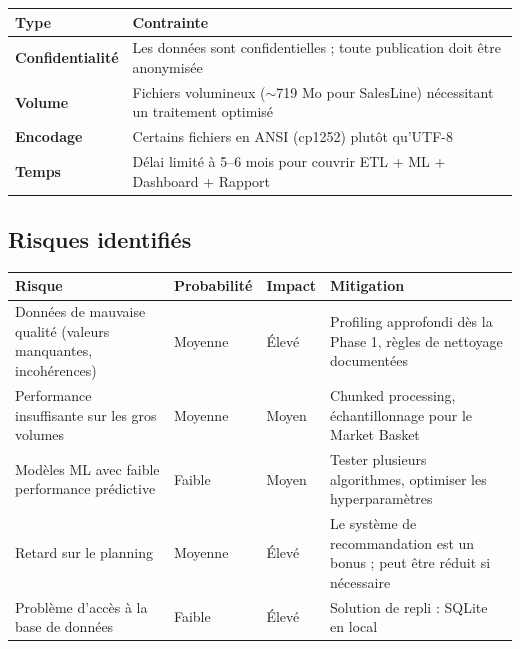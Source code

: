 \documentclass[11pt,a4paper]{article}
\begin{document}
\begin{center}
\small
\begin{tabularx}{\textwidth}{>{\bfseries\color{primary}}p{3cm} X}
\toprule
\rowcolor{primary}
\color{white}\bfseries Type & \color{white}\bfseries Contrainte \\
\midrule
Confidentialité & Les données sont confidentielles ; toute publication doit être anonymisée \\
\rowcolor{lightbg}
Volume          & Fichiers volumineux ($\sim$719 Mo pour SalesLine) nécessitant un traitement optimisé \\
Encodage        & Certains fichiers en ANSI (cp1252) plutôt qu'UTF-8 \\
\rowcolor{lightbg}
Temps           & Délai limité à 5--6 mois pour couvrir ETL + ML + Dashboard + Rapport \\
\bottomrule
\end{tabularx}
\end{center}

\subsection{Risques identifiés}

\begin{center}
\small
\begin{tabularx}{\textwidth}{X p{2cm} p{1.5cm} X}
\toprule
\rowcolor{primary}
\color{white}\bfseries Risque & \color{white}\bfseries Probabilité & \color{white}\bfseries Impact & \color{white}\bfseries Mitigation \\
\midrule
Données de mauvaise qualité (valeurs manquantes, incohérences) & Moyenne & Élevé & Profiling approfondi dès la Phase 1, règles de nettoyage documentées \\
\rowcolor{lightbg}
Performance insuffisante sur les gros volumes & Moyenne & Moyen & Chunked processing, échantillonnage pour le Market Basket \\
Modèles ML avec faible performance prédictive & Faible & Moyen & Tester plusieurs algorithmes, optimiser les hyperparamètres \\
\rowcolor{lightbg}
Retard sur le planning & Moyenne & Élevé & Le système de recommandation est un bonus ; peut être réduit si nécessaire \\
Problème d'accès à la base de données & Faible & Élevé & Solution de repli : SQLite en local \\
\bottomrule
\end{tabularx}
\end{center}
\end{document}
